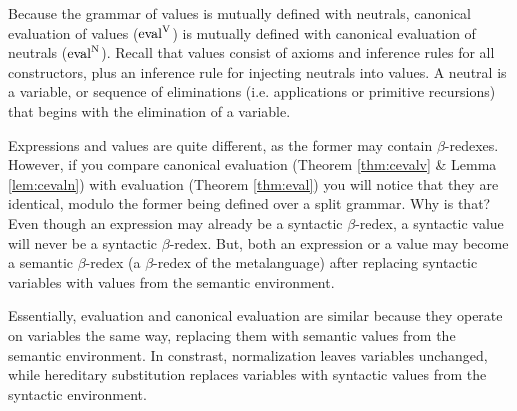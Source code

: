 \documentclass{llncs}
\newcommand{\refthm}[1]{Theorem \ref{thm:#1}}
\newcommand{\reflem}[1]{Lemma \ref{lem:#1}}
\def\cevalv{\fun{eval}^\con{V}}
\def\cevaln{\fun{eval}^\con{N}}
\newcommand{\con}[1]{\textmd{#1}}
\newcommand{\fun}[1]{\textmd{#1}}
\begin{document}
Because the grammar of values is mutually defined with neutrals,
canonical evaluation of values ($\cevalv$) is mutually defined with canonical
evaluation of neutrals ($\cevaln$). Recall that values consist of axioms and
inference rules for all constructors, plus an inference rule for
injecting neutrals into values. A neutral is a variable, or 
sequence of eliminations (i.e. applications or primitive recursions)
that begins with the elimination of a variable.

Expressions and values are quite different, as the former
may contain $\beta$-redexes. However, if you compare
canonical evaluation (\refthm{cevalv} \& \reflem{cevaln}) with
evaluation (\refthm{eval}) you will notice that they are identical,
modulo the former being defined over a split grammar. Why is that?
Even though an expression may already be a syntactic $\beta$-redex, a
syntactic value will never be a syntactic $\beta$-redex. But, both an
expression or a value may become a semantic $\beta$-redex (a
$\beta$-redex of the metalanguage) after replacing syntactic variables
with values from the semantic environment. 

Essentially, evaluation and canonical evaluation are similar because
they operate on variables the same way, replacing them with semantic
values from the semantic environment. In constrast,
normalization leaves variables unchanged, while hereditary
substitution replaces variables with syntactic values from the
syntactic environment. 
\end{document}
